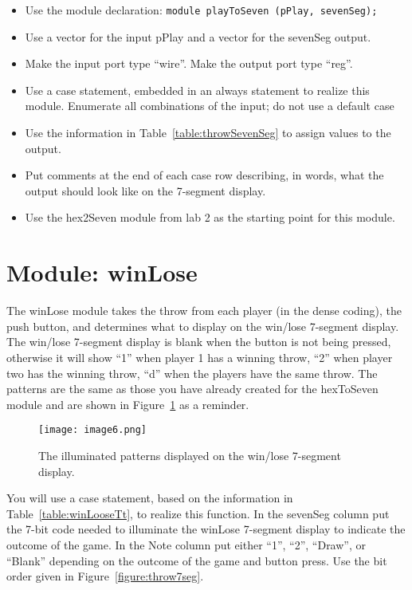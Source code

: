 \begin{itemize}
\item
  Use the module declaration: \verb+module playToSeven (pPlay, sevenSeg);+
\item
  Use a vector for the input pPlay and a vector for the sevenSeg output.
\item
  Make the input port type ``wire''. Make the output port type ``reg''.
\item
  Use a case statement, embedded in an always statement to realize this
  module. Enumerate all combinations of the input; do not use a default
  case
\item
  Use the information in Table~\ref{table:throwSevenSeg} to assign values to the output.
\item
  Put comments at the end of each case row describing, in words, what
  the output should look like on the 7-segment display.
\item
  Use the hex2Seven module from lab 2 as the starting point for this
  module.
\end{itemize}

\hypertarget{winlose-module}{%
\section{Module: winLose}
\label{winlose-module}}

The winLose module takes the throw from each player (in the dense
coding), the push button, and determines what to display on the win/lose
7-segment display. The win/lose 7-segment display is blank when the
button is not being pressed, otherwise it will show ``1'' when player 1
has a winning throw, ``2'' when player two has the winning throw, ``d''
when the players have the same throw. The patterns are the same as those
you have already created for the hexToSeven module and are shown in
Figure~\ref{fig:winLose7seg} as a reminder.

\begin{figure}[ht]
\texttt{[image:  image6.png]}
\caption{The illuminated patterns displayed on the win/lose 7-segment display.}
\label{fig:winLose7seg}
\end{figure}

You will use a case statement, based on the information in Table~\ref{table:winLooseTt}, to
realize this function. In the sevenSeg column put the 7-bit code needed
to illuminate the winLose 7-segment display to indicate the outcome of
the game. In the Note column put either ``1'', ``2'', ``Draw'', or
``Blank'' depending on the outcome of the game and button press. Use the
bit order given in Figure~\ref{figure:throw7seg}.

